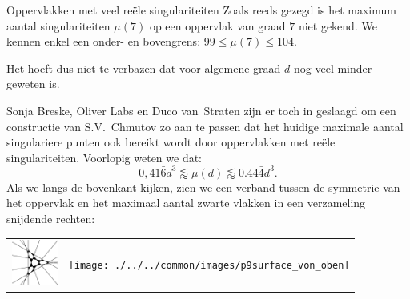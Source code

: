 \begin{surferPage}[216 Singulariteiten]{Oppervlakken met veel re\"ele singulariteiten}
    Zoals reeds gezegd is het maximum aantal singulariteiten
    $\mu(7)$ op een oppervlak van graad $7$ niet gekend.
   We kennen enkel een onder- en bovengrens: $99\leqslant \mu(7) \leqslant 104$. 


    Het hoeft dus niet te verbazen dat voor algemene graad $d$ nog veel minder geweten is. 

    Sonja Breske, Oliver Labs en Duco van~Straten zijn er toch in geslaagd om een constructie van S.V.\ Chmutov zo aan te passen dat het huidige maximale aantal singulariere punten ook bereikt wordt door oppervlakken met re\"ele singulariteiten. 
    Voorlopig weten we dat:
    \[0,41\bar{6}d^3 \lessapprox \mu(d) \lessapprox 0.44\bar{4} d^3.\]
     Als we langs de bovenkant kijken, zien we een verband tussen de symmetrie van het oppervlak en het maximaal aantal zwarte vlakken in een verzameling snijdende rechten:
    \begin{center}
      \begin{tabular}{c@{\qquad}c}
        \includegraphics[height=1.5cm]{./../../common/images/vielesing.pdf}
        &
        \texttt{[image: ./../../common/images/p9surface\_von\_oben]}
      \end{tabular}
    \end{center}
\end{surferPage}

